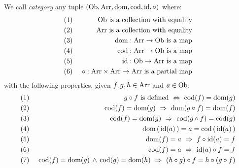 \begin{defin}\label{Cat:def:category}
    We call {\em category} any tuple $(\mbox{\rm Ob}, \mbox{\rm Arr}, \mbox{\rm dom}, \mbox{\rm cod}, \mbox{\rm id}, \circ)$ where:
        \begin{eqnarray*}
            (1)&\ &\mbox{\rm Ob}\mbox{\ is a collection with equality}\\
            (2)&\ &\mbox{\rm Arr}\mbox{\ is a collection with equality}\\
            (3)&\ &\mbox{\rm dom}:\mbox{\rm Arr}\to\mbox{\rm Ob}\mbox{\ is a map}\\
            (4)&\ &\mbox{\rm cod}:\mbox{\rm Arr}\to\mbox{\rm Ob}\mbox{\ is a map}\\
            (5)&\ &\mbox{\rm id}:\mbox{\rm Ob}\to\mbox{\rm Arr}\mbox{\ is a map}\\
            (6)&\ &\circ:\mbox{\rm Arr}\times\mbox{\rm Arr}\to\mbox{\rm Arr}\mbox{\ is a partial map}
        \end{eqnarray*}
    with the following properties, given $f,g,h\in\mbox{\rm Arr}$ and $a\in\mbox{\rm Ob}$: 
        \begin{eqnarray*}
            (1)&\ &g\circ f\mbox{\ is defined}
                \ \Leftrightarrow\ \mbox{\rm cod}(f)=\mbox{\rm dom}(g) \\
            (2)&\ &\mbox{\rm cod}(f)=\mbox{\rm dom}(g)\ \Rightarrow\ \mbox{\rm dom}(g\circ f) = \mbox{\rm dom}(f)\\
            (3)&\ &\mbox{\rm cod}(f)=\mbox{\rm dom}(g)\ \Rightarrow\ \mbox{\rm cod}(g\circ f) = \mbox{\rm cod}(g)\\
            (4)&\ &\mbox{\rm dom}\,(\,\mbox{\rm id}(a)\,) = a = \mbox{\rm cod}\,(\,\mbox{\rm id}(a)\,)\\
            (5)&\ &\mbox{\rm dom}(f)=a\ \Rightarrow\ f\circ\mbox{\rm id}(a) = f\\
            (6)&\ &\mbox{\rm cod}(f)=a\ \Rightarrow\ \mbox{\rm id}(a)\circ f = f\\
            (7)&\ &\mbox{\rm cod}(f)=\mbox{\rm dom}(g)\,\land\,\mbox{\rm cod}(g)=\mbox{\rm dom}(h)
                \ \Rightarrow\ (h\circ g)\circ f = h\circ(g\circ f) 
        \end{eqnarray*} 
\end{defin}
